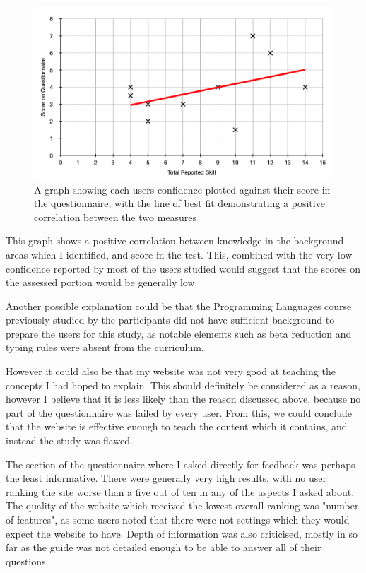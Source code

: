 \documentclass{l4proj}
\begin{document}
\begin{figure}[h!]
    \centering
    \includegraphics[width=1\linewidth]{dissertation/images/skill_against_score.png}
    \caption{A graph showing each users confidence plotted against their score in the questionnaire, with the line of best fit demonstrating a positive correlation between the two measures}
    \label{fig:enter-label}
\end{figure}    

This graph shows a positive correlation between knowledge in the background areas which I identified, and score in the test.  This, combined with the very low confidence reported by most of the users studied would suggest that the scores on the assessed portion would be generally low.

Another possible explanation could be that the Programming Languages course previously studied by the participants did not have sufficient background to prepare the users for this study, as notable elements such as beta reduction and typing rules were absent from the curriculum. 

However it could also be that my website was not very good at teaching the concepts I had hoped to explain.  This should definitely be considered as a reason, however I believe that it is less likely than the reason discussed above, because no part of the questionnaire was failed by every user.  From this, we could conclude that the website is effective enough to teach the content which it contains, and instead the study was flawed.

The section of the questionnaire where I asked directly for feedback was perhaps the least informative.  There were generally very high results, with no user ranking the site worse than a five out of ten in any of the aspects I asked about.  The quality of the website which received the lowest overall ranking was "number of features", as some users noted that there were not settings which they would expect the website to have.  Depth of information was also criticised, mostly in so far as the guide was not detailed enough to be able to answer all of their questions.
\end{document}
